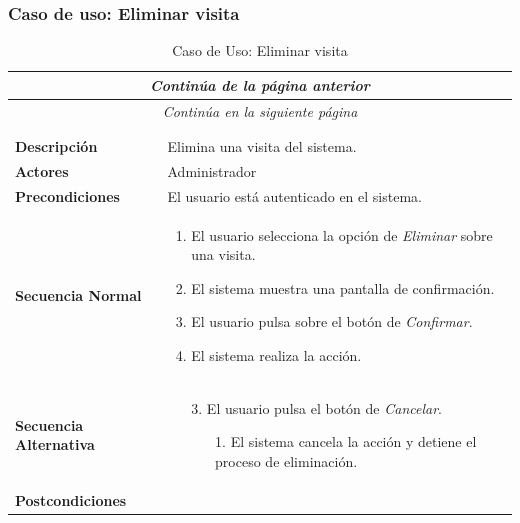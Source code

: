 


\newpage
\subsubsection*{Caso de uso: Eliminar visita }
\begin{longtable}{| p{4cm} | p{10cm} |}
\endfirsthead
\multicolumn{2}{c}{\textit{Continúa de la página anterior}}\\[12pt]
\hline
\endhead
\hline
\multicolumn{2}{c}{\textit{Continúa en la siguiente página}} \\
\endfoot
\hline
\caption{Caso de Uso: Eliminar visita}\label{fig:1}\\
\endlastfoot


\hline
\multicolumn{2}{|c|}{\textbf{CU$<$33$>$ - Eliminar Visita}} \\

\hline
\textbf{Descripción} &
Elimina una visita del sistema.\\

\hline
\textbf{Actores} &
Administrador\\

\hline
\textbf{Precondiciones} &
El usuario está autenticado en el sistema.\\

\hline
\textbf{Secuencia Normal} &\mbox{}\par\vspace{-\baselineskip}
\begin{enumerate}[leftmargin=0.7cm, topsep=0.1cm]
\item El usuario selecciona la opción de \textit{Eliminar} sobre una visita.
\item El sistema muestra una pantalla de confirmación.
\item El usuario pulsa sobre el botón de \textit{Confirmar}.
\item El sistema realiza la acción.
\end{enumerate}


\\
\hline
\textbf{Secuencia Alternativa} &\mbox{}\par\vspace{-\baselineskip}
\begin{enumerate}[leftmargin=0.9cm, topsep=0.1cm]
\item[3.] El usuario pulsa el botón de \textit{Cancelar}.
	\begin{itemize}
	\item[1.] El sistema cancela la acción y detiene el proceso de eliminación.
	\end{itemize}
\end{enumerate}
\\

\hline
\textbf{Postcondiciones} & \\
\hline
\end{longtable}



